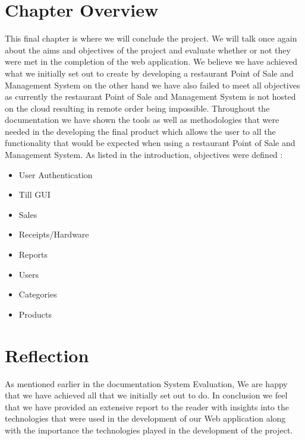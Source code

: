 \section{Chapter Overview}
This final chapter is where we will conclude the project. We will talk once again about the  aims and objectives of the project and evaluate whether or not they were met in the completion of the web application.
\newline
\newline
We believe we have achieved what we initially set out to create by developing a restaurant Point of Sale and Management System on the other hand we have also failed to meet all objectives as currently the restaurant Point of Sale and Management System is not hosted on the cloud resulting in remote order being impossible. Throughout the documentation we have shown the tools as well as methodologies that were needed in the developing the final product which allows the user to all the functionality that would be expected when using a restaurant Point of Sale and Management System. As listed in the introduction, objectives were defined :

\begin{itemize}
  \item User Authentication
  \item Till GUI
  \item Sales
  \item Receipts/Hardware
  \item Reports
  \item Users
  \item Categories
  \item Products
  
\end{itemize}

\section{Reflection}

As mentioned earlier in the documentation System Evaluation, We are happy that we have achieved all that we initially set out to do. In conclusion we feel that we have provided an extensive report to the reader with insights into the technologies that were used in the development of our Web application along with the importance the technologies played in the development of the project.

